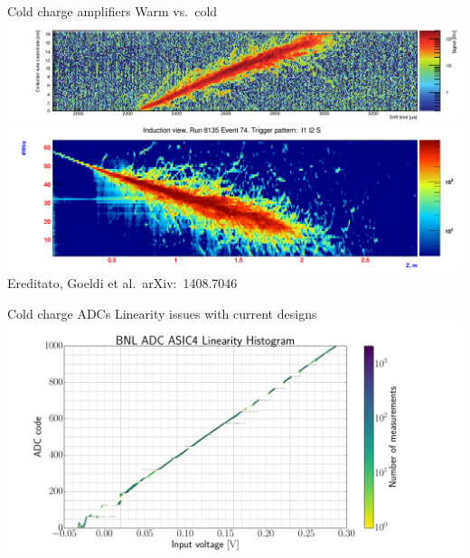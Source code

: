 \documentclass[]{beamer}
\newcommand*{\emphcoltitle}{blue}
\begin{document}
\begin{frame}{Cold charge amplifiers}{\color{\emphcoltitle} Warm vs.\ cold}
	\centering
	\includegraphics[width=\textwidth]{defence/AT_warmPreamps}\\
	\includegraphics[width=\textwidth]{defence/AT_coldPreamps}\\
	{\tiny Ereditato, Goeldi et al.\ arXiv:~1408.7046~\cite{AT_larasic}}\\
\end{frame}

\begin{frame}{Cold charge ADCs}{\color{\emphcoltitle} Linearity issues with current designs}
	\centering
	\includegraphics[height=.8\textheight]{bnl/bnl_adc_lin}
\end{frame}
\end{document}
